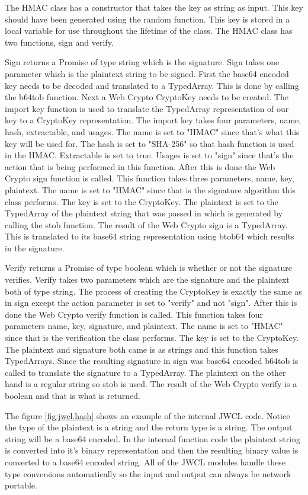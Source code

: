 The HMAC class has a constructor that takes the key as string as input. This key should have been generated using the random function. This key is stored in a local variable for use throughout the lifetime of the class. The HMAC class has two functions, sign and verify.


Sign returns a Promise of type string which is the signature. Sign takes one parameter which is the plaintext string to be signed. First the base64 encoded key needs to be decoded and translated to a TypedArray. This is done by calling the b64tob function. Next a Web Crypto CryptoKey needs to be created. The import key function is used to translate the TypedArray representation of our key to a CryptoKey representation. The import key takes four parameters, name, hash, extractable, and usages. The name is set to "HMAC" since that's what this key will be used for. The hash is set to "SHA-256" so that hash function is used in the HMAC. Extractable is set to true. Usages is set to "sign" since that's the action that is being performed in this function. After this is done the Web Crypto sign function is called. This function takes three parameters, name, key, plaintext. The name is set to "HMAC" since that is the signature algorithm this class performs. The key is set to the CryptoKey. The plaintext is set to the TypedArray of the plaintext string that was passed in which is generated by calling the stob function. The result of the Web Crypto sign is a TypedArray. This is translated to its base64 string representation using btob64 which results in the signature.

Verify returns a Promise of type boolean which is whether or not the signature verifies. Verify takes two parameters which are the signature and the plaintext both of type string. The process of creating the CryptoKey is exactly the same as in sign except the action parameter is set to "verify" and not "sign". After this is done the Web Crypto verify function is called. This function takes four parameters name, key, signature, and plaintext. The name is set to "HMAC" since that is the verification the class performs. The key is set to the CryptoKey. The plaintext and signature both came is as strings and this function takes TypedArrays. Since the resulting signature in sign was base64 encoded b64tob is called to translate the signature to a TypedArray. The plaintext on the other hand is a regular string so stob is used. The result of the Web Crypto verify is a boolean and that is what is returned.

The figure \ref{fig:jwcl.hash} shows an example of the internal JWCL code. Notice the type of the plaintext is a string and the return type is a string. The output string will be a base64 encoded. In the internal function code the plaintext string is converted into it's binary representation and then the resulting binary value is converted to a base64 encoded string. All of the JWCL modules handle these type conversions automatically so the input and output can always be network portable.

